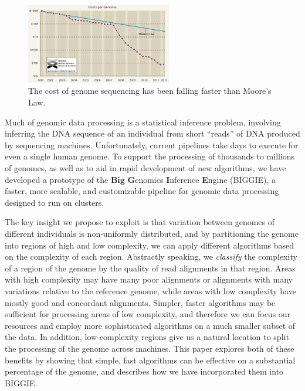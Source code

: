 \documentclass[10pt]{article}
\newcommand\TODO[1]{\textcolor{red}{TODO: #1}}
\begin{document}
\begin{figure}[h!]
  \centering
  \includegraphics[width=2.5in]{figs/sequencing-costs.png}
  \caption{The cost of genome sequencing has been falling faster than Moore's Law.}
  \label{moore}
\end{figure}

Much of genomic data processing is a statistical inference problem, involving
inferring the DNA sequence of an individual from short ``reads'' of DNA produced
by sequencing machines. Unfortunately, current pipelines take days to execute
for even a single human genome.
To support the processing of thousands to millions of genomes, as well as to
aid in rapid development of new algorithms, we have developed a prototype of the {\bf Big} {\bf G}enomics {\bf I}nference
{\bf E}ngine (BIGGIE), a faster, more scalable, and customizable pipeline for
genomic data processing designed to run on clusters.  

The key insight we propose to exploit is that variation between
genomes of different individuals is non-uniformly distributed, and by
partitioning the genome into regions of high and low complexity, we can apply
different algorithms based on the complexity of each region.
Abstractly speaking, we \emph{classify} the complexity of a region of the genome
by the quality of read alignments in that region.  Areas with high complexity may
have many poor alignments or alignments with many variations relative to the
reference genome, while areas with low complexity have mostly good and
concordant alignments.
Simpler, faster algorithms may be sufficient for processing areas of low
complexity, and therefore we can focus our resources and employ more
sophisticated algorithms on a
much smaller subset of the data. In addition, low-complexity regions give us a
natural location to split the processing of the genome across machines.
This paper explores both of these benefits by showing that simple, fast algorithms
can be effective on a substantial percentage of the genome, and describes how we have 
incorporated them into BIGGIE.
\end{document}
